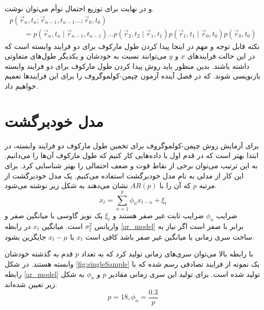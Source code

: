 و در نهایت برای توزیع احتمال توأم می‌توان نوشت.
 \begin{equation}
  \begin{array}{l}
    p(\vec{r}_n,t_n; \vec{r}_{n-1},t_{n-1} \dotsc ;\vec{r}_{0},t_0)\\ \qquad = p(\vec{r}_{n},t_n\mid \vec{r}_{n-1},t_{n-1}) \dotsc p(\vec{r}_{2},t_{2} \mid \vec{r}_{1},t_{1}) p(\vec{r}_{1},t_{1} \mid \vec{r}_{0},t_{0}) p(\vec{r}_0,t_0)
    \label{markov}
  \end{array}
\end{equation}
نکته قابل توجه و مهم در اینجا پیدا کردن طول مارکوف برای دو فرایند وابسته است که در این حالت فرایندهای $x$ و $y$ می‌توانند نسبت به خودشان و یکدیگر طول‌های متفاوتی داشته باشند. بدین منظور باید روش پیدا کردن طول مارکوف برای دو فرایند وابسته بازنویسی شوند. که در فصل آینده 
آزمون چپمن-کولموگروف را برای این فرایندها تعمیم خواهیم داد.

\section{مدل خودبرگشت}
برای آزمایش روش چپمن-کولموگروف برای تخمین طول مارکوف دو فرایند وابسته، در ابتدا بهتر است 
که در قدم اول با داده‌هایی کار کنیم که طول مارکوف آن‌ها را می‌دانیم. به این ترتیب می‌توان برخی از نقاط قوت
 و ضعف احتمالی را بهتر شناسایی کرد. برای این کار از مدلی به نام مدل خودبرگشت استفاده می‌کنیم.
یک مدل خودبرگشت از مرتبه $p$ که آن را با $AR(p)$ نشان می‌دهند به شکل زیر نوشته می‌شود.
\begin{equation}
  x_{t}=\sum_{n=1}^{p} \phi_n x_{t-n}+\xi_{t}
  \label{ar_model}
\end{equation}
ضرایب $\phi_n$ ضرایب ثابت غیر صفر هستند و $\xi_t$ یک نویز گاوسی با میانگین صفر و 
واریانس $\sigma_{\xi}^2$ است. میانگین $x_t$ در رابطه \ref{ar_model} برابر با صفر است 
اگر نیاز به ساخت سری زمانی با میانگین غیر صفر باشد کافی است $x_t$ با $x_t - \mu$ جایگزین 
بشود.\cite{shumway2011time}


 با رابطه بالا می‌توان سری‌های زمانی تولید کرد که به تعداد $p$ قدم به گذشته خودشان وابسته هستند. 
 در شکل \ref{fig:singleSample} یک نمونه از فرایند تصادفی رسم شده که 
 با رابطه \ref{ar_model} تولید شده است. برای تولید این سری زمانی مقادیر $p$ و $\phi_n$ به شکل زیر تعیین شده‌اند.
 $$
 p=18, \phi_n = \frac{0.3}{p}
 $$

